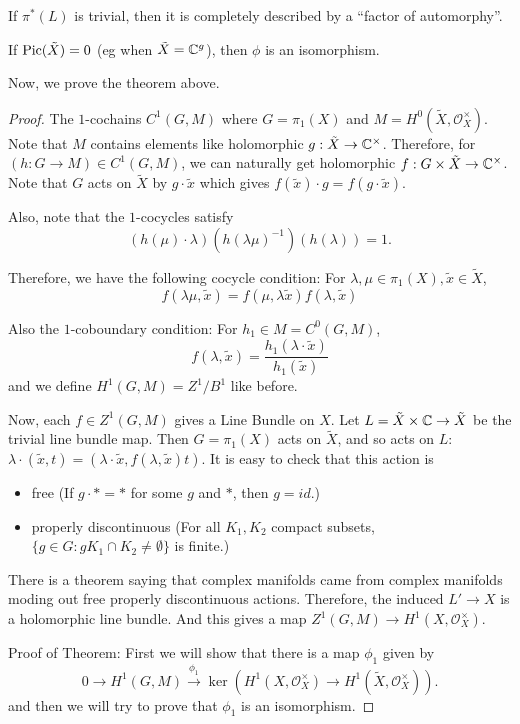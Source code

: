 \begin{corollary}
If $\pi^*(L)$ is trivial, then it is completely described by a ``factor of automorphy''.
\end{corollary}

\begin{corollary}
If $\operatorname{Pic}(\tilde{X})=0$ (eg when $\tilde{X}={\mathbb C}^g$), then $\phi$ is an isomorphism.
\end{corollary}

Now, we prove the theorem above.
\begin{proof}
The $1$-cochains $C^1(G,M)$ where $G=\pi_1(X)$ and $M=H^0(\tilde{X},\mathcal{O}_X^\times)$. Note that $M$ contains elements like holomorphic $g:\tilde{X}\to {\mathbb C}^\times$. Therefore, for $(h:G\to M)\in C^1(G,M)$, we can naturally get holomorphic $f:G\times \tilde{X}\to {\mathbb C}^\times$. Note that $G$ acts on $\tilde{X}$ by $g\cdot \tilde{x}$ which gives $f(\tilde{x})\cdot g=f(g\cdot \tilde{x})$.

Also, note that the $1$-cocycles satisfy 
$$(h(\mu)\cdot \lambda) (h(\lambda \mu)^{-1})(h(\lambda))=1.$$

Therefore, we have the following cocycle condition: For $\lambda,\mu\in \pi_1(X), \tilde{x}\in \tilde{X}$,
$$f(\lambda\mu,\tilde{x})=f(\mu,\lambda\tilde{x})f(\lambda,\tilde{x})$$

Also the $1$-coboundary condition: For $h_1\in M=C^0(G,M)$,
$$f(\lambda,\tilde{x})=\frac{h_1(\lambda\cdot\tilde{x})}{h_1(\tilde{x})}$$
and we define $H^1(G,M)=Z^1/B^1$ like before.

Now, each $f\in Z^1(G,M)$ gives a Line Bundle on $X$. Let $L=\tilde{X}\times {\mathbb C}\to \tilde{X}$ be the trivial line bundle map. Then $G=\pi_1(X)$ acts on $\tilde{X}$, and so acts on $L$: $\lambda\cdot(\tilde{x},t)=(\lambda\cdot \tilde{x},f(\lambda,\tilde{x})t)$.
It is easy to check that this action is
\begin{itemize}
\item free (If $g\cdot *=*$ for some $g$ and $*$, then $g=id$.)
\item properly discontinuous (For all $K_1,K_2$ compact subsets, $\{g\in G:gK_1\cap K_2\not=\emptyset\}$ is finite.)
\end{itemize}

There is a theorem saying that complex manifolds came from complex manifolds moding out free properly discontinuous actions. Therefore, the induced $L'\to X$ is a holomorphic line bundle. And this gives a map $Z^1(G,M)\to H^1(X,\mathcal{O}_X^\times)$. 

Proof of Theorem: 
First we will show that there is a map $\phi_1$ given by
$$0\to H^1(G,M)\overset{\phi_1}{\to} \ker(H^1(X,\mathcal{O}_X^\times)\to H^1(\tilde{X},\mathcal{O}_X^\times)).$$
and then we will try to prove that $\phi_1$ is an isomorphism.


\end{proof}
